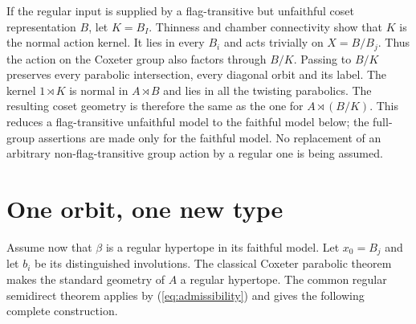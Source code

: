 If the regular input is supplied by a flag-transitive but unfaithful coset representation $B$, let $K=B_I$. Thinness and chamber connectivity show that $K$ is the normal action kernel. It lies in every $B_i$ and acts trivially on $X=B/B_j$. Thus the action on the Coxeter group also factors through $B/K$. Passing to $B/K$ preserves every parabolic intersection, every diagonal orbit and its label. The kernel $1\rtimes K$ is normal in $A\rtimes B$ and lies in all the twisting parabolics. The resulting coset geometry is therefore the same as the one for $A\rtimes(B/K)$. This reduces a flag-transitive unfaithful model to the faithful model below; the full-group assertions are made only for the faithful model. No replacement of an arbitrary non-flag-transitive group action by a regular one is being assumed.

\section{One orbit, one new type}
Assume now that $\beta$ is a regular hypertope in its faithful model. Let $x_0=B_j$ and let $b_i$ be its distinguished involutions. The classical Coxeter parabolic theorem makes the standard geometry of $A$ a regular hypertope. The common regular semidirect theorem applies by (\ref{eq:admissibility}) and gives the following complete construction.

